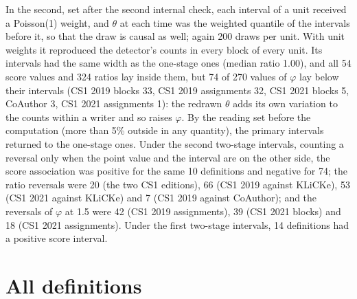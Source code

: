 In the second, set after the second internal check, each interval of a unit received a Poisson(1) weight, and $\theta$ at each
time was the weighted quantile of the intervals before it, so that the draw is causal as well; again 200 draws per unit.
With unit weights it reproduced the detector's counts in every block of every unit. Its intervals had the same width
as the one-stage ones (median ratio 1.00), and all 54 score values and 324 ratios lay inside them, but 74 of 270 values
of $\varphi$ lay below their intervals (CS1 2019 blocks 33, CS1 2019 assignments 32, CS1 2021 blocks 5, CoAuthor 3,
CS1 2021 assignments 1): the redrawn $\theta$ adds its own variation to the counts within a writer and so raises
$\varphi$. By the reading set before the computation (more than 5\% outside in any quantity), the primary intervals
returned to the one-stage ones. Under the second two-stage intervals, counting a reversal only when the point value and the interval
are on the other side, the score association was positive for the same 10 definitions and negative for 74; the ratio
reversals were 20 (the two CS1 editions), 66 (CS1 2019 against KLiCKe), 53 (CS1 2021 against KLiCKe) and 7 (CS1 2019
against CoAuthor); and the reversals of $\varphi$ at 1.5 were 42 (CS1 2019 assignments), 39 (CS1 2021 blocks) and 18
(CS1 2021 assignments). Under the first two-stage intervals, 14 definitions had a positive score interval.

\section{All definitions}
\label{app:all}

